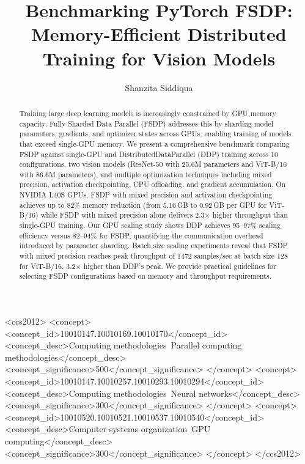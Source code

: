 \documentclass[sigconf]{acmart}
\begin{document}
\title{Benchmarking PyTorch FSDP: Memory-Efficient Distributed Training for Vision Models}

\author{Shanzita Siddiqua}

\renewcommand{\shortauthors}{Siddiqua}

\begin{abstract}
Training large deep learning models is increasingly constrained by GPU memory capacity. Fully Sharded Data Parallel (FSDP) addresses this by sharding model parameters, gradients, and optimizer states across GPUs, enabling training of models that exceed single-GPU memory. We present a comprehensive benchmark comparing FSDP against single-GPU and DistributedDataParallel (DDP) training across 10 configurations, two vision models (ResNet-50 with 25.6M parameters and ViT-B/16 with 86.6M parameters), and multiple optimization techniques including mixed precision, activation checkpointing, CPU offloading, and gradient accumulation. On NVIDIA L40S GPUs, FSDP with mixed precision and activation checkpointing achieves up to 82\% memory reduction (from 5.16\,GB to 0.92\,GB per GPU for ViT-B/16) while FSDP with mixed precision alone delivers 2.3$\times$ higher throughput than single-GPU training. Our GPU scaling study shows DDP achieves 95--97\% scaling efficiency versus 82--94\% for FSDP, quantifying the communication overhead introduced by parameter sharding. Batch size scaling experiments reveal that FSDP with mixed precision reaches peak throughput of 1472 samples/sec at batch size 128 for ViT-B/16, 3.2$\times$ higher than DDP's peak. We provide practical guidelines for selecting FSDP configurations based on memory and throughput requirements.
\end{abstract}

\begin{CCSXML}
<ccs2012>
 <concept>
  <concept_id>10010147.10010169.10010170</concept_id>
  <concept_desc>Computing methodologies~Parallel computing methodologies</concept_desc>
  <concept_significance>500</concept_significance>
 </concept>
 <concept>
  <concept_id>10010147.10010257.10010293.10010294</concept_id>
  <concept_desc>Computing methodologies~Neural networks</concept_desc>
  <concept_significance>300</concept_significance>
 </concept>
 <concept>
  <concept_id>10010520.10010521.10010537.10010540</concept_id>
  <concept_desc>Computer systems organization~GPU computing</concept_desc>
  <concept_significance>300</concept_significance>
 </concept>
</ccs2012>
\end{CCSXML}
\end{document}
